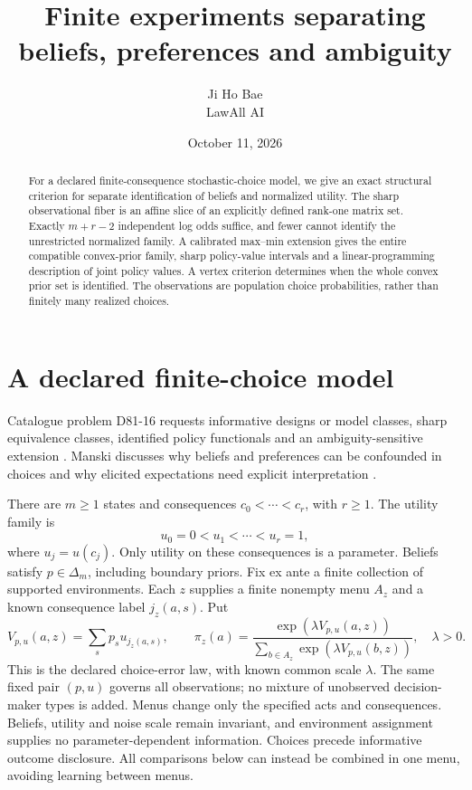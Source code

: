 \documentclass[11pt]{article}
\title{Finite experiments separating beliefs, preferences and ambiguity}
\author{Ji Ho Bae\\\small LawAll AI}
\date{October 11, 2026}
\begin{document}
\maketitle
\begin{abstract}
For a declared finite-consequence stochastic-choice model, we give an exact structural criterion for separate identification of beliefs and normalized utility. The sharp observational fiber is an affine slice of an explicitly defined rank-one matrix set. Exactly $m+r-2$ independent log odds suffice, and fewer cannot identify the unrestricted normalized family. A calibrated max--min extension gives the entire compatible convex-prior family, sharp policy-value intervals and a linear-programming description of joint policy values. A vertex criterion determines when the whole convex prior set is identified. The observations are population choice probabilities, rather than finitely many realized choices.
\end{abstract}

\section{A declared finite-choice model}
Catalogue problem D81-16 requests informative designs or model classes, sharp equivalence classes, identified policy functionals and an ambiguity-sensitive extension \cite{Catalogue}. Manski discusses why beliefs and preferences can be confounded in choices and why elicited expectations need explicit interpretation \cite[\S\S II.A, VII.C]{Manski}.

There are $m\ge1$ states and consequences $c_0<\cdots<c_r$, with $r\ge1$. The utility family is
\[
 u_0=0<u_1<\cdots<u_r=1,
\]
where $u_j=u(c_j)$. Only utility on these consequences is a parameter. Beliefs satisfy $p\in\Delta_m$, including boundary priors. Fix ex ante a finite collection of supported environments. Each $z$ supplies a finite nonempty menu $A_z$ and a known consequence label $j_z(a,s)$. Put
\[
 V_{p,u}(a,z)=\sum_s p_su_{j_z(a,s)},\qquad
 \pi_z(a)=\frac{\exp(\lambda V_{p,u}(a,z))}
                   {\sum_{b\in A_z}\exp(\lambda V_{p,u}(b,z))},
 \quad \lambda>0.
\]
This is the declared choice-error law, with known common scale $\lambda$. The same fixed pair $(p,u)$ governs all observations; no mixture of unobserved decision-maker types is added. Menus change only the specified acts and consequences. Beliefs, utility and noise scale remain invariant, and environment assignment supplies no parameter-dependent information. Choices precede informative outcome disclosure. All comparisons below can instead be combined in one menu, avoiding learning between menus.
\end{document}
